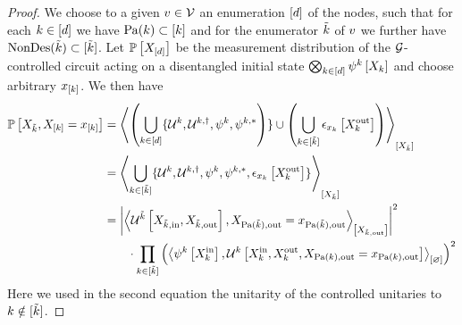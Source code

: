 \begin{proof}
    We choose to a given $v\in\mathcal{V}$ an enumeration $[d]$ of the nodes, such that for each $k\in[d]$ we have $\mathrm{Pa}(k)\subset[k]$ and for the enumerator $\tilde{k}$ of $v$ we further have $\mathrm{NonDes}(\tilde{k})\subset[\tilde{k}]$.
    Let $\mathbb{P}\left[X_{[d]}\right]$ be the measurement distribution of the $\mathcal{G}$-controlled circuit acting on a disentangled initial state $\bigotimes_{k\in[d]}\psi^{k}\left[X_{k}\right]$ and choose arbitrary $x_{[k]}$.
    We then have
    \begin{align*}
        \mathbb{P}\left[X_{\tilde{k}},X_{[k]}=x_{[k]}\right]
        &= \left\langle \left(\bigcup_{k\in[d]}\{\mathcal{U}^{k},\mathcal{U}^{k,\dagger},\psi^{k},\psi^{k,*}\right)\}
            \cup \left(\bigcup_{k\in[\tilde{k}]} \epsilon_{x_{k}}\left[X_{k}^{\mathrm{out}}\right]\right)
        \right\rangle_{\left[ 
            X_{\tilde{k}}
         \right]} \\
        &= \left\langle \bigcup_{k\in[\tilde{k}]}\{\mathcal{U}^{k},\mathcal{U}^{k,\dagger},\psi^{k},\psi^{k,*},\epsilon_{x_{k}}\left[X_{k}^{\mathrm{out}}\right]\}\right\rangle_{\left[ 
            X_{\tilde{k}}
         \right]} \\
        & = \left|\left\langle \mathcal{U}^{\tilde{k}}\left[X_{\tilde{k},\mathrm{in}},X_{\tilde{k},\mathrm{out}}\right],X_{\mathrm{Pa}(\tilde{k}),\mathrm{out}}=x_{\mathrm{Pa}(\tilde{k}),\mathrm{out}}\right\rangle_{\left[ X_{\tilde{k},\mathrm{out}} \right]}\right|^2 \\
        & \quad \quad \cdot \prod_{k\in[\tilde{k}]}
        \left(\left\langle \psi^{k}\left[X_{k}^{\mathrm{in}}\right],\mathcal{U}^{k}\left[X_{k}^{\mathrm{in}},X_{k}^{\mathrm{out}},X_{\mathrm{Pa}(k),\mathrm{out}}=x_{\mathrm{Pa}(k),\mathrm{out}}\right]\right\rangle_{\left[ \varnothing \right]}\right)^2
    \end{align*}
    Here we used in the second equation the unitarity of the controlled unitaries to $k\notin[\tilde{k}]$.

\end{proof}
